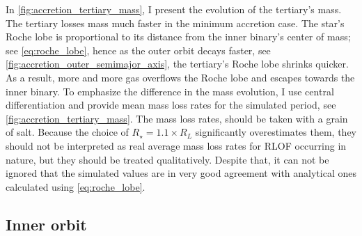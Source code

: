 In \cref{fig:accretion_tertiary_mass}, I present the evolution of the tertiary's mass. The tertiary losses mass much faster in the minimum accretion case. The star's Roche lobe is proportional to its distance from the inner binary's center of mass; see \cref{eq:roche_lobe}, hence as the outer orbit decays faster, see \cref{fig:accretion_outer_semimajor_axis}, the tertiary's Roche lobe shrinks quicker. As a result, more and more gas overflows the Roche lobe and escapes towards the inner binary. To emphasize the difference in the mass evolution, I use central differentiation and provide mean mass loss rates for the simulated period, see \cref{fig:accretion_tertiary_mass}. The mass loss rates, should be taken with a grain of salt. Because the choice of $R_{\star} = 1.1 \times R_L$ significantly overestimates them, they should not be interpreted as real average mass loss rates for RLOF occurring in nature, but they should be treated qualitatively. Despite that, it can not be ignored that the simulated values are in very good agreement with analytical ones calculated using \cref{eq:roche_lobe}.

\subsection{Inner orbit}

